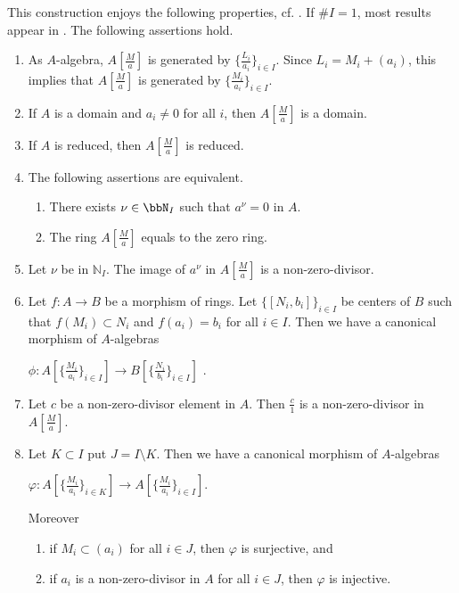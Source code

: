\documentclass[10pt]{alggeom}
\theoremstyle{definition}
\numberwithin{equation}{section}
\begin{document}
This construction enjoys the following properties, cf. \cite[§2]{Ma23d}. If $\#I=1$, most results appear in \cite[\href{https://stacks.math.columbia.edu/tag/052P}{Tag 052P}]{stacks-project}.
\prop[{\cite{Ma23d}}] The following assertions hold.
 \begin{enumerate} \item As $A$-algebra, $A[\frac{M}{a}]$ is generated by $\big\{ \frac{L_i}{a_i}\big\}_{i \in I}$. Since $L_i=M_i+(a_i)$, this implies that  $A[\frac{M}{a}]$ is generated by $\big\{ \frac{M_i}{a_i}\big\}_{i \in I}$.
 \item If $A$ is a domain and $a_i \ne 0$ for all $i$, then $A[\frac{M}{a}]$ is a domain.
 \item If $A$ is reduced, then $A[\frac{M}{a}]$ is reduced.
\item  The following assertions are equivalent.\begin{enumerate}
\item  There exists $\nu \in \bbN_I$ such that $a^\nu =0$ in $A$.
\item The ring $A[\frac{M}{a}]$ equals to the zero ring.\end{enumerate}
\item   Let $\nu  $ be in $\mathbb{N} _I$. The image of $a ^\nu$ in $A[\frac{M}{a}]$ is a non-zero-divisor.
\item  Let $f:A \to B$ be a morphism of rings. Let $\{[N_i,b_i]\}_{i \in I}$ be centers of $B$ such that $f(M_i) \subset N_i$  and $f(a_i)=b_i$ for all $i\in I$.  Then we have a canonical morphism of $A$-algebras
\begin{center} $\phi: A[\big\{ \frac{M_i}{a_i}\big\}_{i \in I}] \to B[\big\{ \frac{N_i}{b_i}\big\}_{i \in I}]$ .\end{center}
\item  Let $c$ be a non-zero-divisor element in $A$. Then $\frac{c}{1}$ is a non-zero-divisor in $A[\frac{M}{a}]$.
\item Let $K \subset I$ put $J = I \setminus K$. Then we have a canonical morphism of $A$-algebras
\begin{center} $ \varphi :A[\big\{ \frac{M_i}{a_i}\big\}_{i \in K}] \longrightarrow A[\big\{ \frac{M_i}{a_i}\big\}_{i \in I}] . $ \end{center} Moreover 
\begin{enumerate}
\item  if $M_i\subset  (a_i)$ for all $i \in J$, then $\varphi$ is surjective, and
\item if $a_i$ is a non-zero-divisor in $A$ for all $i \in J$, then $\varphi$ is injective.

\end{enumerate}
\end{enumerate}
\end{document}
